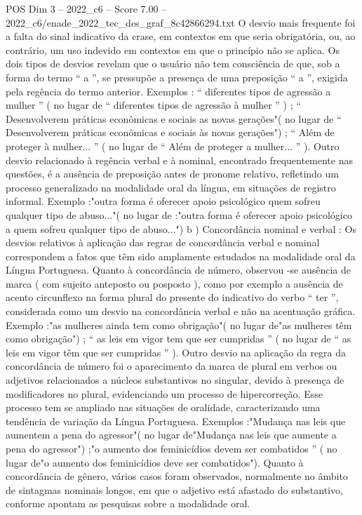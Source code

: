 \begin{textsample}{POS Dim 3 – 2022\_c6 – Score 7.00 – 2022\_c6/enade\_2022\_tec\_des\_graf\_8c42866294.txt}
O desvio mais frequente foi a falta do sinal indicativo da crase, em contextos em que seria obrigatória, ou, ao contrário, um uso indevido em contextos em que o princípio não se aplica.
Os dois tipos de desvios revelam que o usuário não tem consciência de que, sob a forma do termo “ a ”, se pressupõe a presença de uma preposição “ a ”, exigida pela regência do termo anterior.
Exemplos : “ diferentes tipos de agressão a mulher ” ( no lugar de “ diferentes tipos de agressão à mulher ” ) ; “ Desenvolverem práticas econômicas e sociais as novas gerações"( no lugar de “ Desenvolverem práticas econômicas e sociais às novas gerações") ; “ Além de proteger à mulher... ” ( no lugar de “ Além de proteger a mulher... ” ).
Outro desvio relacionado à regência verbal e à nominal, encontrado frequentemente nas questões, é a ausência de preposição antes de pronome relativo, refletindo um processo generalizado na modalidade oral da língua, em situações de registro informal.
Exemplo :"outra forma é oferecer apoio psicológico quem sofreu qualquer tipo de abuso..."( no lugar de :"outra forma é oferecer apoio psicológico a quem sofreu qualquer tipo de abuso...") b ) Concordância nominal e verbal : Os desvios relativos à aplicação das regras de concordância verbal e nominal correspondem a fatos que têm sido amplamente estudados na modalidade oral da Língua Portuguesa.
Quanto à concordância de número, observou -se ausência de marca ( com sujeito anteposto ou posposto ), como por exemplo a ausência de acento circunflexo na forma plural do presente do indicativo do verbo “ ter ”, considerada como um desvio na concordância verbal e não na acentuação gráfica.
Exemplo :"as mulheres ainda tem como obrigação"( no lugar de"as mulheres têm como obrigação") ; “ as leis em vigor tem que ser cumpridas ” ( no lugar de “ as leis em vigor têm que ser cumpridas ” ).
Outro desvio na aplicação da regra da concordância de número foi o aparecimento da marca de plural em verbos ou adjetivos relacionados a núcleos substantivos no singular, devido à presença de modificadores no plural, evidenciando um processo de hipercorreção.
Esse processo tem se ampliado nas situações de oralidade, caracterizando uma tendência de variação da Língua Portuguesa.
Exemplos :"Mudança nas leis que aumentem a pena do agressor"( no lugar de"Mudança nas leis que aumente a pena do agressor") ;"o aumento dos feminicídios devem ser combatidos ” ( no lugar de"o aumento dos feminicídios deve ser combatidos").
Quanto à concordância de gênero, vários casos foram observados, normalmente no âmbito de sintagmas nominais longos, em que o adjetivo está afastado do substantivo, conforme apontam as pesquisas sobre a modalidade oral.

\end{textsample}

